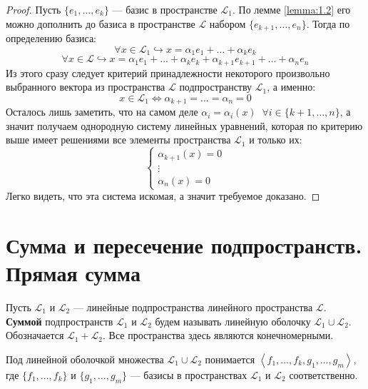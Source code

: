 \documentclass[11pt]{article}
\begin{document}
\begin{proof}
    Пусть $\{e_1, \ldots, e_k\}$ --- базис в пространстве $\mathcal{L}_1$. По лемме \ref{lemma:1.2} его можно дополнить до базиса в пространстве $\mathcal{L}$ 
    набором $\{e_{k + 1}, \ldots, e_n\}$. Тогда по определению базиса:
    \[\forall x \in \mathcal{L}_1 \hookrightarrow x = \alpha_1 e_1 + \ldots + \alpha_k e_k\]
    \[\forall x \in \mathcal{L} \hookrightarrow x = \alpha_1 e_1 + \ldots + \alpha_k e_k + \alpha_{k + 1} e_{k + 1} + \ldots + \alpha_n e_n\]
    Из этого сразу следует критерий принадлежности некоторого произвольно выбранного вектора из пространства $\mathcal{L}$ подпространству $\mathcal{L}_1$, а именно:
    \[x \in \mathcal{L}_1 \iff \alpha_{k + 1} = \ldots = \alpha_n = 0\]
    Осталось лишь заметить, что на самом деле $\alpha_i = \alpha_i(x) \; \; \forall i \in \{k + 1, \ldots, n\}$, а значит получаем однородную систему линейных уравнений, которая по критерию выше 
    имеет решениями все элементы пространства $\mathcal{L}_1$ и только их:
    \begin{equation*}
        \begin{cases}
            \alpha_{k + 1}(x) = 0 \\
            \vdots \\
            \alpha_n(x) = 0
        \end{cases}
    \end{equation*}
    Легко видеть, что эта система искомая, а значит требуемое доказано.
\end{proof}

\section{Сумма и пересечение подпространств. Прямая сумма}

\begin{definition}
    Пусть $\mathcal{L}_1$ и $\mathcal{L}_2$ --- линейные подпространства линейного пространства $\mathcal{L}$. \textbf{Суммой} подпространств 
    $\mathcal{L}_1$ и $\mathcal{L}_2$ будем называть линейную оболочку $\mathcal{L}_1 \cup \mathcal{L}_2$. Обозначается $\mathcal{L}_1 + \mathcal{L}_2$.
    Все пространства здесь являются конечномерными.
\end{definition}

\begin{remark}
    Под линейной оболочкой множества $\mathcal{L}_1 \cup \mathcal{L}_2$ понимается $\left\langle f_1, \ldots, f_k, g_1, \ldots, g_m \right\rangle$, 
    где $\{f_1, \ldots, f_k\}$ и $\{g_1, \ldots, g_m\}$ --- базисы в пространствах $\mathcal{L}_1$ и $\mathcal{L}_2$ соответственно.
\end{remark}
\end{document}
